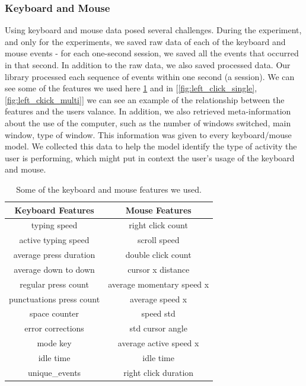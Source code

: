 \documentclass[../main.tex]{subfiles}
\begin{document}
    \subsubsection{Keyboard and Mouse}

    Using keyboard and mouse data posed several challenges. During the experiment, and only for the experiments, 
    we saved raw data of each of the keyboard and mouse events - for each one-second session, we saved all the events that occurred in that second. 
    In addition to the raw data, we also saved processed data. Our library processed each sequence of events within one second (a session). 
    We can see some of the features we used here \ref{table:keyboard_mouse_features} 
    and in [\ref{fig:left_click_single}, \ref{fig:left_ckick_multi}] we can see an example of the relationship between the features and the users valance. 
    In addition, we also retrieved meta-information about the use of the computer, 
    such as the number of windows switched, main window, type of window. This information was given to every keyboard/mouse model. 
    We collected this data to help the model identify the type of activity the user is performing, which might put in context the user's usage of 
    the keyboard and mouse.
 
    \begin{table}[htp]
        \centering
        \begin{tabular}{cc}
        \toprule
        Keyboard Features        & Mouse Features            \\ \midrule
        typing speed             & right click count         \\
        active typing speed      & scroll speed              \\
        average press duration   & double click count        \\
        average down to down     & cursor x distance         \\
        regular press count      & average momentary speed x \\
        punctuations press count & average speed x           \\
        space counter            & speed std                 \\
        error corrections        & std cursor angle          \\
        mode key                 & average active speed x    \\
        idle time                & idle time                 \\
        unique\_events           & right click duration      \\ \bottomrule
        \end{tabular}
        \caption{Some of the keyboard and mouse features we used.}
        \label{table:keyboard_mouse_features}
    \end{table}
\end{document}
